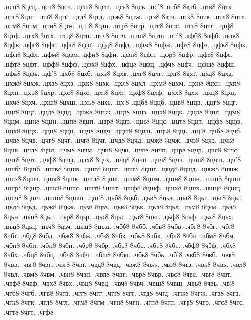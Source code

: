 {.цсц8
8цсц.
.цсч8
8цсч.
.цсш8
8цсш.
.цсь8
8цсь.
.цс'8
.цтб8
8цтб.
.цтв8
8цтв.
.цтг8
8цтг.
.цтґ8
8цтґ.
.цтд8
8цтд.
.цтж8
8цтж.
.цтз8
8цтз.
.цтк8
8цтк.
.цтл8
8цтл.
.цтм8
8цтм.
.цтн8
8цтн.
.цтп8
8цтп.
.цтр8
8цтр.
.цтс8
8цтс.
.цтт8
8цтт.
.цтф8
8цтф.
.цтх8
8цтх.
.цтц8
8цтц.
.цтч8
8цтч.
.цтш8
8цтш.
.цт'8
.цфб8
8цфб.
.цфв8
8цфв.
.цфг8
8цфг.
.цфґ8
8цфґ.
.цфд8
8цфд.
.цфж8
8цфж.
.цфз8
8цфз.
.цфк8
8цфк.
.цфл8
8цфл.
.цфм8
8цфм.
.цфн8
8цфн.
.цфп8
8цфп.
.цфр8
8цфр.
.цфс8
8цфс.
.цфт8
8цфт.
.цфф8
8цфф.
.цфх8
8цфх.
.цфц8
8цфц.
.цфч8
8цфч.
.цфш8
8цфш.
.цфь8
8цфь.
.цф'8
.цхб8
8цхб.
.цхв8
8цхв.
.цхг8
8цхг.
.цхґ8
8цхґ.
.цхд8
8цхд.
.цхж8
8цхж.
.цхз8
8цхз.
.цхк8
8цхк.
.цхл8
8цхл.
.цхм8
8цхм.
.цхн8
8цхн.
.цхп8
8цхп.
.цхр8
8цхр.
.цхс8
8цхс.
.цхт8
8цхт.
.цхф8
8цхф.
.цхх8
8цхх.
.цхц8
8цхц.
.цхч8
8цхч.
.цхш8
8цхш.
.цхь8
8цхь.
.цх'8
.ццб8
8ццб.
.ццв8
8ццв.
.ццг8
8ццг.
.ццґ8
8ццґ.
.ццд8
8ццд.
.ццж8
8ццж.
.ццз8
8ццз.
.ццк8
8ццк.
.ццл8
8ццл.
.ццм8
8ццм.
.ццн8
8ццн.
.ццп8
8ццп.
.ццр8
8ццр.
.ццс8
8ццс.
.ццт8
8ццт.
.ццф8
8ццф.
.ццх8
8ццх.
.ццц8
8ццц.
.ццч8
8ццч.
.ццш8
8ццш.
.цць8
8цць.
.цц'8
.цчб8
8цчб.
.цчв8
8цчв.
.цчг8
8цчг.
.цчґ8
8цчґ.
.цчд8
8цчд.
.цчж8
8цчж.
.цчз8
8цчз.
.цчк8
8цчк.
.цчл8
8цчл.
.цчм8
8цчм.
.цчн8
8цчн.
.цчп8
8цчп.
.цчр8
8цчр.
.цчс8
8цчс.
.цчт8
8цчт.
.цчф8
8цчф.
.цчх8
8цчх.
.цчц8
8цчц.
.цчч8
8цчч.
.цчш8
8цчш.
.цч'8
.цшб8
8цшб.
.цшв8
8цшв.
.цшг8
8цшг.
.цшґ8
8цшґ.
.цшд8
8цшд.
.цшж8
8цшж.
.цшз8
8цшз.
.цшк8
8цшк.
.цшл8
8цшл.
.цшм8
8цшм.
.цшн8
8цшн.
.цшп8
8цшп.
.цшр8
8цшр.
.цшс8
8цшс.
.цшт8
8цшт.
.цшф8
8цшф.
.цшх8
8цшх.
.цшц8
8цшц.
.цшч8
8цшч.
.цшш8
8цшш.
.цш'8
.цьб8
8цьб.
.цьв8
8цьв.
.цьг8
8цьг.
.цьґ8
8цьґ.
.цьд8
8цьд.
.цьж8
8цьж.
.цьз8
8цьз.
.цьк8
8цьк.
.цьл8
8цьл.
.цьм8
8цьм.
.цьн8
8цьн.
.цьп8
8цьп.
.цьр8
8цьр.
.цьс8
8цьс.
.цьт8
8цьт.
.цьф8
8цьф.
.цьх8
8цьх.
.цьц8
8цьц.
.цьч8
8цьч.
.цьш8
8цьш.
.чбб8
8чбб.
.чбв8
8чбв.
.чбг8
8чбг.
.чбґ8
8чбґ.
.чбд8
8чбд.
.чбж8
8чбж.
.чбз8
8чбз.
.чбк8
8чбк.
.чбл8
8чбл.
.чбм8
8чбм.
.чбн8
8чбн.
.чбп8
8чбп.
.чбр8
8чбр.
.чбс8
8чбс.
.чбт8
8чбт.
.чбф8
8чбф.
.чбх8
8чбх.
.чбц8
8чбц.
.чбч8
8чбч.
.чбш8
8чбш.
.чбь8
8чбь.
.чб'8
.чвб8
8чвб.
.чвв8
8чвв.
.чвг8
8чвг.
.чвґ8
8чвґ.
.чвд8
8чвд.
.чвж8
8чвж.
.чвз8
8чвз.
.чвк8
8чвк.
.чвл8
8чвл.
.чвм8
8чвм.
.чвн8
8чвн.
.чвп8
8чвп.
.чвр8
8чвр.
.чвс8
8чвс.
.чвт8
8чвт.
.чвф8
8чвф.
.чвх8
8чвх.
.чвц8
8чвц.
.чвч8
8чвч.
.чвш8
8чвш.
.чвь8
8чвь.
.чв'8
.чгб8
8чгб.
.чгв8
8чгв.
.чгг8
8чгг.
.чгґ8
8чгґ.
.чгд8
8чгд.
.чгж8
8чгж.
.чгз8
8чгз.
.чгк8
8чгк.
.чгл8
8чгл.
.чгм8
8чгм.
.чгн8
8чгн.
.чгп8
8чгп.
.чгр8
8чгр.
.чгс8
8чгс.
.чгт8
8чгт.
.чгф8
}
